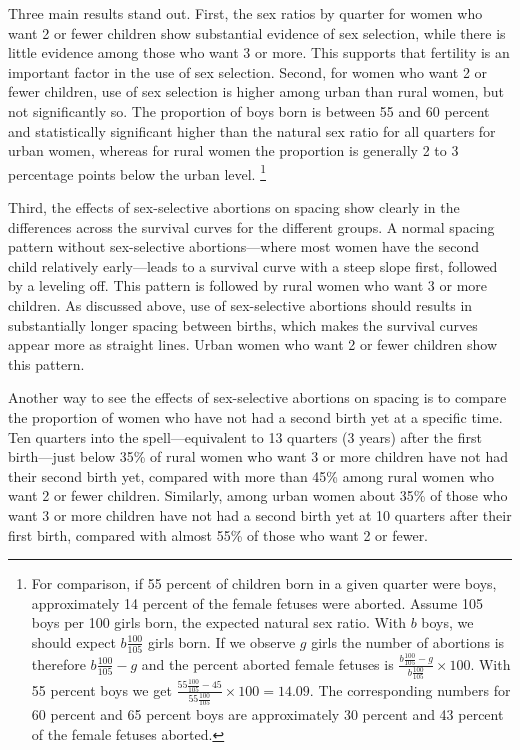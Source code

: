 \documentclass[12pt,letterpaper]{article}
\begin{document}
Three main results stand out.
First, the sex ratios by quarter for women who want 2 or fewer children show 
substantial evidence of sex selection, while there is little evidence among those who want 
3 or more.
This supports that fertility is an important factor in the use of sex selection.
Second, for women who want 2 or fewer children, use of sex selection is higher among urban 
than rural women, but not significantly so.
The proportion of boys born is between 55 and 60 percent and statistically 
significant higher than the natural sex ratio for all quarters for urban women, whereas
for rural women the proportion is generally 2 to 3 percentage points below the urban 
level.%
\footnote{
For comparison, if 55 percent of children born in a given quarter were boys,
approximately 14 percent of the female fetuses were aborted.
Assume 105 boys per 100 girls born, the expected natural sex ratio.
With $b$ boys, we should expect $b\frac{100}{105}$ girls born.
If we observe $g$ girls the number of abortions is therefore $b\frac{100}{105}-g$
and the percent aborted female fetuses is 
$\frac{b\frac{100}{105}-g}{b\frac{100}{105}}\times 100$.
With 55 percent boys we get $\frac{55\frac{100}{105}-45}{55\frac{100}{105}}\times 100 = 14.09$.
The corresponding numbers for 60 percent and 65 percent boys are approximately 30 percent and
43 percent of the female fetuses aborted.
}

Third, the effects of sex-selective abortions on spacing show clearly in the differences 
across the survival curves for the different groups.
A normal spacing pattern without sex-selective abortions---where most women have the second 
child relatively early---leads to a survival curve with a steep slope first, followed 
by a leveling off.
This pattern is followed by rural women who want 3 or more children.
As discussed above, use of sex-selective abortions should results in substantially
longer spacing between births, which makes the survival curves appear more as 
straight lines.
Urban women who want 2 or fewer children show this pattern.

Another way to see the effects of sex-selective abortions on spacing is to compare the 
proportion of women who have not had a second birth yet at a specific time.
Ten quarters into the spell---equivalent to 13 quarters (3 years) after the 
first birth---just below 35\% of rural women who want 3 or more children have not had their 
second birth yet, compared with more than 45\% among rural women who want 2 or fewer children.
Similarly, among urban women about 35\% of those who want 3 or more children have not had 
a second birth yet at 10 quarters after their first birth, compared with almost 55\% of 
those  who want 2 or fewer.
\end{document}
